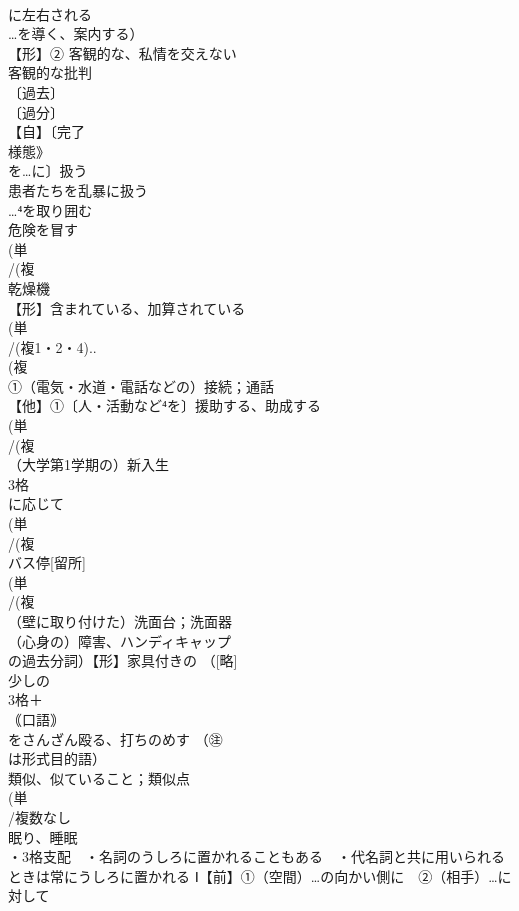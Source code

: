 \documentclass[8pt]{extreport}
\begin{document}
\begin{CJK}{UTF8}{min}
\\	に左右される 
\\	…を導く、案内する）
\\	【形】② 客観的な、私情を交えない 
\\	客観的な批判
\\	〔過去〕
\\	〔過分〕
\\	【自】〔完了
\\	様態》
\\	を…に〕扱う 
\\	患者たちを乱暴に扱う 
\\	…⁴を取り囲む
\\	危険を冒す
\\	(単
\\	/(複
\\	乾燥機 
\\	【形】含まれている、加算されている 
\\	(単
\\	/(複1・2・4)..
\\	(複
\\	①（電気・水道・電話などの）接続；通話 
\\	【他】①〔人・活動など⁴を〕援助する、助成する
\\	(単
\\	/(複
\\	（大学第1学期の）新入生 
\\	3格	
\\	に応じて
\\	(単
\\	/(複
\\	バス停[留所] 
\\	(単
\\	/(複
\\	（壁に取り付けた）洗面台；洗面器 
\\	（心身の）障害、ハンディキャップ 
\\	の過去分詞）【形】家具付きの （[略]
\\	少しの
\\	3格＋
\\	｟口語｠ 
\\	をさんざん殴る、打ちのめす （㊟
\\	は形式目的語）
\\	類似、似ていること；類似点
\\	(単
\\	/複数なし 
\\	眠り、睡眠 
\\	・3格支配　・名詞のうしろに置かれることもある　・代名詞と共に用いられるときは常にうしろに置かれる Ⅰ【前】①（空間）…の向かい側に　②（相手）…に対して 

\end{CJK}
\end{document}
